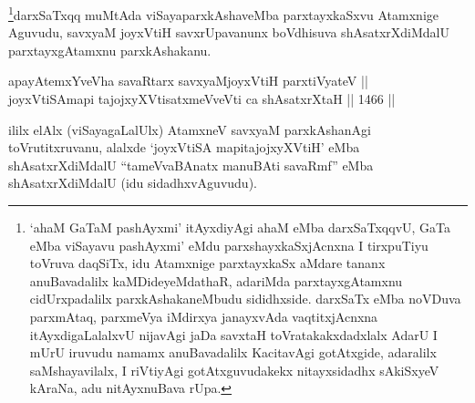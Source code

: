 \begin{artha}
\footnote{`ahaM GaTaM pashAyxmi' itAyxdiyAgi ahaM eMba darxSaTxqqvU, GaTa eMba viSayavu pashAyxmi' eMdu parxshayxkaSxjAcnxna I tirxpuTiyu toVruva daqSiTx, idu Atamxnige parxtayxkaSx aMdare tananx anuBavadalilx kaMDideyeMdathaR, adariMda parxtayxgAtamxnu cidUrxpadalilx parxkAshakaneMbudu sididhxside. darxSaTx eMba noVDuva parxmAtaq, parxmeVya iMdirxya janayxvAda vaqtitxjAcnxna itAyxdigaLalalxvU nijavAgi jaDa savxtaH toVratakakxdadxlalx AdarU I mUrU iruvudu namamx anuBavadalilx KacitavAgi gotAtxgide, adaralilx saMshayavilalx, I riVtiyAgi gotAtxguvudakekx nitayxsidadhx sAkiSxyeV kAraNa, adu nitAyxnuBava rUpa.}darxSaTxqq muMtAda viSayaparxkAshaveMba parxtayxkaSxvu Atamxnige Aguvudu, savxyaM joyxVtiH savxrUpavanunx boVdhisuva shAsatxrXdiMdalU parxtayxgAtamxnu parxkAshakanu.
\end{artha}


\begin{shl}
\footnotemark[3]apayAtemxYveVha savaRtarx savxyaMjoyxVtiH parxtiVyateV || \\
joyxVtiSAmapi tajojxyXVtisatxmeVveVti ca shAsatxrXtaH ||  1466 ||  
\end{shl}

\begin{artha}
ililx elAlx (viSayagaLalUlx) AtamxneV savxyaM parxkAshanAgi toVrutitxruvanu, alalxde `joyxVtiSA mapitajojxyXVtiH' eMba shAsatxrXdiMdalU ``tameVvaBAnatx manuBAti savaRmf'' eMba shAsatxrXdiMdalU (idu sidadhxvAguvudu).
\end{artha}


